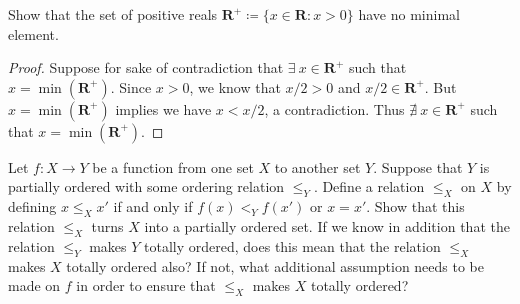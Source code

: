\begin{exercise}\label{ex 8.5.4}
    Show that the set of positive reals \(\mathbf{R}^+ \coloneqq \{x \in \mathbf{R} : x > 0\}\) have no minimal element.
\end{exercise}

\begin{proof}
    Suppose for sake of contradiction that \(\exists\ x \in \mathbf{R}^+\) such that \(x = \min(\mathbf{R}^+)\).
    Since \(x > 0\), we know that \(x / 2 > 0\) and \(x / 2 \in \mathbf{R}^+\).
    But \(x = \min(\mathbf{R}^+)\) implies we have \(x < x / 2\), a contradiction.
    Thus \(\nexists\ x \in \mathbf{R}^+\) such that \(x = \min(\mathbf{R}^+)\).
\end{proof}

\begin{exercise}\label{ex 8.5.5}
    Let \(f : X \to Y\) be a function from one set \(X\) to another set \(Y\).
    Suppose that \(Y\) is partially ordered with some ordering relation \(\leq_Y\).
    Define a relation \(\leq_X\) on \(X\) by defining \(x \leq_X x'\) if and only if \(f(x) <_Y f(x')\) or \(x = x'\).
    Show that this relation \(\leq_X\) turns \(X\) into a partially ordered set.
    If we know in addition that the relation \(\leq_Y\) makes \(Y\) totally ordered, does this mean that the relation \(\leq_X\) makes \(X\) totally ordered also?
    If not, what additional assumption needs to be made on \(f\) in order to ensure that \(\leq_X\) makes \(X\) totally ordered?
\end{exercise}

